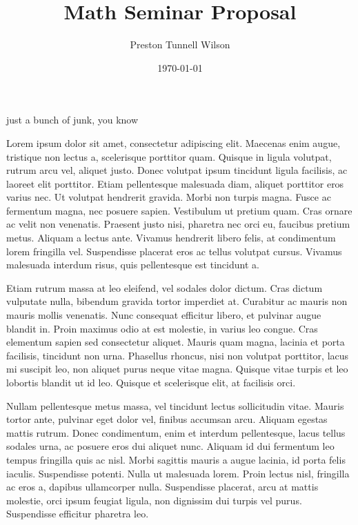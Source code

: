 \documentclass{article}
\begin{document}
\title{
Math Seminar Proposal
}

\author{
Preston Tunnell Wilson }

\date{
\today }

\maketitle %
just a bunch of junk, you know

Lorem ipsum dolor sit amet, consectetur adipiscing elit.
Maecenas enim augue, tristique non lectus a, scelerisque porttitor quam. 
Quisque in ligula volutpat, rutrum arcu vel, aliquet justo.
Donec volutpat ipsum tincidunt ligula facilisis, ac laoreet elit porttitor.
Etiam pellentesque malesuada diam, aliquet porttitor eros varius nec.
Ut volutpat hendrerit gravida.
Morbi non turpis magna.
Fusce ac fermentum magna, nec posuere sapien.
Vestibulum ut pretium quam.
Cras ornare ac velit non venenatis.
Praesent justo nisi, pharetra nec orci eu, faucibus pretium metus.
Aliquam a lectus ante.
Vivamus hendrerit libero felis, at condimentum lorem fringilla vel.
Suspendisse placerat eros ac tellus volutpat cursus.
Vivamus malesuada interdum risus, quis pellentesque est tincidunt a.


Etiam rutrum massa at leo eleifend, vel sodales dolor dictum.
Cras dictum vulputate nulla, bibendum gravida tortor imperdiet at.
Curabitur ac mauris non mauris mollis venenatis.
Nunc consequat efficitur libero, et pulvinar augue blandit in.
Proin maximus odio at est molestie, in varius leo congue.
Cras elementum sapien sed consectetur aliquet.
Mauris quam magna, lacinia et porta facilisis, tincidunt non urna.
Phasellus rhoncus, nisi non volutpat porttitor, lacus mi suscipit leo, non aliquet purus neque vitae magna.
Quisque vitae turpis et leo lobortis blandit ut id leo.
Quisque et scelerisque elit, at facilisis orci.


Nullam pellentesque metus massa, vel tincidunt lectus sollicitudin vitae.
Mauris tortor ante, pulvinar eget dolor vel, finibus accumsan arcu.
Aliquam egestas mattis rutrum.
Donec condimentum, enim et interdum pellentesque, lacus tellus sodales urna, ac posuere eros dui aliquet nunc.
Aliquam id dui fermentum leo tempus fringilla quis ac nisl.
Morbi sagittis mauris a augue lacinia, id porta felis iaculis.
Suspendisse potenti.
Nulla ut malesuada lorem.
Proin lectus nisl, fringilla ac eros a, dapibus ullamcorper nulla.
Suspendisse placerat, arcu at mattis molestie, orci ipsum feugiat ligula, non dignissim dui turpis vel purus.
Suspendisse efficitur pharetra leo.
\end{document}
